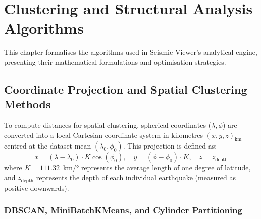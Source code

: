 
\chapter{Clustering and Structural Analysis Algorithms}
\label{ch:algorithms}

This chapter formalises the algorithms used in Seismic Viewer's analytical engine, presenting their mathematical formulations and optimisation strategies.

\section{Coordinate Projection and Spatial Clustering Methods}
\label{sec:projection}
\label{sec:clustering-methods}

To compute distances for spatial clustering, spherical coordinates ($\lambda, \phi$) are converted into a local Cartesian coordinate system in kilometres $(x, y, z)_\text{km}$ centred at the dataset mean $(\lambda_0, \phi_0)$. This projection \cite{snyder1987map} is defined as:
\begin{equation}
    x = (\lambda - \lambda_0) \cdot K \cos(\phi_0), \quad
    y = (\phi - \phi_0) \cdot K, \quad
    z = z_\text{depth}
    \label{eq:projection}
\end{equation}
where $K = 111.32$~km/° represents the average length of one degree of latitude, and $z_\text{depth}$ represents the depth of each individual earthquake (measured as positive downwards).

\subsection{DBSCAN, MiniBatchKMeans, and Cylinder Partitioning}
\label{sec:dbscan-impl}
\label{sec:kmeans-impl}
\label{sec:cylinder-clustering}

